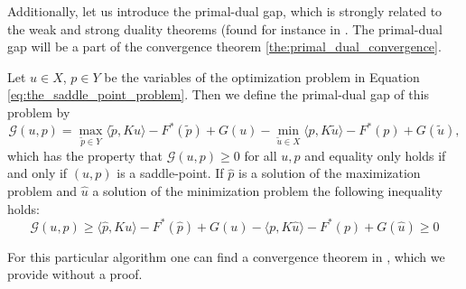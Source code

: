     Additionally, let us introduce the primal-dual gap, which is strongly related to the weak and strong duality theorems (found for instance in \cite{Geiger-Kanzow}. The primal-dual gap will be a part of the convergence theorem \ref{the:primal_dual_convergence}.
    \begin{definition} %
    \label{def:primal_dual_gap}

        Let $u \in X$, $p \in Y$ be the variables of the optimization problem in Equation \ref{eq:the_saddle_point_problem}. Then we define the primal-dual gap of this problem by
            \begin{equation}
                \mathcal{G}(u, p) = \max_{\tilde{p} \in Y} \langle \tilde{p}, Ku \rangle - F^{\ast}(\tilde{p}) + G(u) - \min_{\tilde{u} \in X} \langle p, K\tilde{u} \rangle - F^{\ast}(p) + G(\tilde{u}),
                \label{eq:primal_dual_gap}
            \end{equation}
        which has the property that $\mathcal{G}(u, p) \ge 0$ for all $u, p$ and equality only holds if and only if $(u, p)$ is a saddle-point. If $\hat{p}$ is a solution of the maximization problem and $\hat{u}$ a solution of the minimization problem the following inequality holds:
            $$
                \mathcal{G}(u, p) \ge \langle \hat{p}, Ku \rangle - F^{\ast}(\hat{p}) + G(u) - \langle p, K\hat{u} \rangle - F^{\ast}(p) + G(\hat{u}) \ge 0
            $$
    \end{definition}

    For this particular algorithm one can find a convergence theorem in \cite{Chambolle10afirst-order}, which we provide without a proof.


